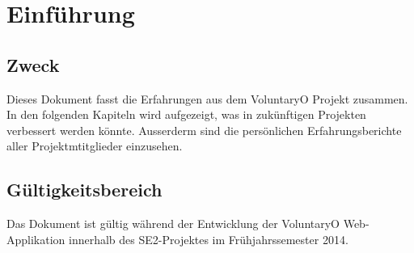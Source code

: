 \chapter{Einführung}
	\section{Zweck}
	Dieses Dokument fasst die Erfahrungen aus dem VoluntaryO Projekt zusammen. In den folgenden Kapiteln wird aufgezeigt, was in zukünftigen Projekten verbessert werden könnte. Ausserderm sind die persönlichen Erfahrungsberichte aller Projektmtitglieder einzusehen.
	
	\section{Gültigkeitsbereich}
	Das Dokument ist gültig während der Entwicklung der VoluntaryO Web-Applikation innerhalb des SE2-Projektes im Frühjahrssemester 2014.

